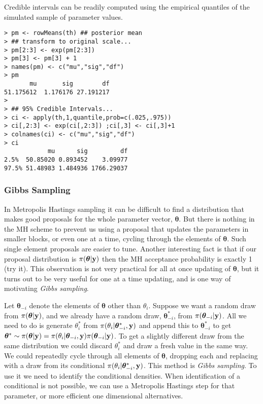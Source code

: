 \documentclass[10pt] {article}
\theoremstyle{definition}
\begin{document}
Credible intervals can be readily computed using the empirical quantiles of the simulated sample of parameter values. 
\begin{lstlisting}
> pm <- rowMeans(th) ## posterior mean
> ## transform to original scale...
> pm[2:3] <- exp(pm[2:3])
> pm[3] <- pm[3] + 1
> names(pm) <- c("mu","sig","df")
> pm
       mu       sig        df 
51.175612  1.176176 27.191217 
> 
> ## 95% Credible Intervals...
> ci <- apply(th,1,quantile,prob=c(.025,.975))
> ci[,2:3] <- exp(ci[,2:3]) ;ci[,3] <- ci[,3]+1
> colnames(ci) <- c("mu","sig","df")
> ci
            mu      sig         df
2.5%  50.85020 0.893452    3.09977
97.5% 51.48983 1.484936 1766.29037
\end{lstlisting}

\subsubsection{Gibbs Sampling \label{sec:gibbs}}

In Metropolis Hastings sampling it can be difficult to find a distribution that makes good proposals for the whole parameter vector, $\bm \theta$. But there is nothing in the MH scheme to prevent us using a proposal that updates the parameters in smaller blocks, or even one at a time, cycling through the elements of $\bm \theta$. Such single element proposals are easier to tune. Another interesting fact is that if our proposal distribution is $\pi({\bm \theta}|{\bf y})$ then the MH acceptance probability is exactly 1 (try it). This observation is not very practical for all at once updating of $\bm\theta$, but it turns out to be very useful for one at a time updating, and is one way of motivating {\em Gibbs sampling}.  

Let ${\bm \theta}_{-i}$ denote the elements of $\bm \theta$ other than $\theta_i$. Suppose we want a random draw from $\pi({\bm \theta}|{\bf y})$, and we already have a random draw, ${\bm \theta}_{-i}^*$, from $\pi({\bm \theta}_{-i}|{\bf y})$. All we need to do is generate $\theta_i^*$ from $\pi(\theta_i|{\bm \theta}_{-i}^*,{\bf y})$ and append this to ${\bm \theta}_{-i}^*$ to get ${\bm \theta}^* \sim \pi({\bm \theta}|{\bf y}) = \pi(\theta_i|{\bm \theta}_{-i},{\bf y})\pi({\bm \theta}_{-i}|{\bf y})$. To get a slightly different draw from the same distribution we could discard $\theta_i^*$ and draw a fresh value in the same way. We could repeatedly cycle through all elements of $\bm \theta$, dropping each and replacing with a draw from its conditional $\pi(\theta_i|{\bm \theta}_{-i}^*,{\bf y})$. 
This method is {\em Gibbs sampling}. To use it we need to identify the conditional densities. When identification of a conditional is not possible, we can use a Metropolis Hastings step for that parameter, or more efficient one dimensional alternatives.
\end{document}
